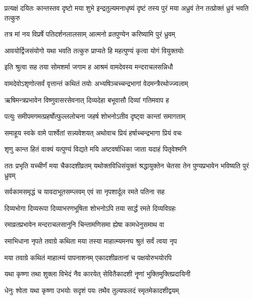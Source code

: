 
\threelineshloka
{प्रत्यक्षं दयितः कान्तस्तव दृष्टो मया शुभे}
{इन्द्रतुल्यमनाधृष्यं दृष्टं तस्य पुरं मया}
{अध्रुवं तेन तत्प्रोक्तं ध्रुवं भवति तत्कुरु}%


\twolineshloka
{तत्र मां नय विप्रर्षे पतिदर्शनलालसाम्}
{आत्मनो व्रतपुण्येन करिष्यामि पुरं ध्रुवम्}%

\twolineshloka
{आवयोर्द्विजसंयोगो यथा भवति तत्कुरु}
{प्राप्यते हि महत्पुण्यं कृत्वा योगं वियुक्तयोः}%

\twolineshloka
{इति श्रुत्वा सह तया सोमशर्मा जगाम ह}
{आश्रमं वामदेवस्य मन्दराचलसन्निधौ}%

\twolineshloka
{वामदेवोऽशृणोत्सर्वं वृत्तान्तं कथितं तयोः}
{अभ्यषिञ्चच्चन्द्रभागां वेदमन्त्रैरथोज्ज्वलाम्}%

\twolineshloka
{ऋषिमन्त्रप्रभावेन विष्णुवासरसेवनात्}
{दिव्यदेहा बभूवासौ दिव्यां गतिमवाप ह}%

\twolineshloka
{पत्युः समीपमगमत्प्रहर्षोत्फुल्ललोचना}
{जहर्ष शोभनोऽतीव दृष्ट्वा कान्तां समागताम्}%

\twolineshloka
{समाहूय स्वके वामे पार्श्वेतां सन्न्यवेशयत्}
{अथोवाच प्रियं हर्षाच्चन्द्रभागा प्रियं वचः}%

\twolineshloka
{शृणु कान्त हितं वाक्यं यत्पुण्यं विद्यते मयि}
{अष्टवर्षाधिका जाता यदाहं पितृवेश्मनि}%

\threelineshloka
{ततः प्रभृति यच्चीर्णं मया चैकादशीव्रतम्}
{यथोक्तविधिसंयुक्तं श्रद्धायुक्तेन चेतसा}
{तेन पुण्यप्रभावेन भविष्यति पुरं ध्रुवम्}%

\twolineshloka
{सर्वकामसमृद्धं च यावदाभूतसम्प्लवम्}
{एवं सा नृपशार्दूल रमते पतिना सह}%

\twolineshloka
{दिव्यभोगा दिव्यरूपा दिव्याभरणभूषिता}
{शोभनोऽपि तया सार्द्धं रमते दिव्यविग्रहः}%

\twolineshloka
{रमाव्रतप्रभावेन मन्दराचलसानुनि}
{चिन्तामणिसमा ह्येषा कामधेनुसमाथ वा}%

\twolineshloka
{रमाभिधाना नृपते तवाग्रे कथिता मया}
{तस्या माहात्म्यमनघ श्रुतं सर्वं त्वया नृप}%

\twolineshloka
{मया तवाग्रे कथितं माहात्म्यं पापनाशनम्}
{एकादशीव्रतानां च पक्षयोरुभयोरपि}%

\twolineshloka
{यथा कृष्णा तथा शुक्ला विभेदं नैव कारयेत्}
{सेवितैकादशी नॄणां भुक्तिमुक्तिप्रदायिनी}%

\twolineshloka
{धेनुः श्वेता यथा कृष्णा उभयोः सदृशं पयः}
{तथैव तुल्यफलदं स्मृतमेकादशीद्वयम्}%

